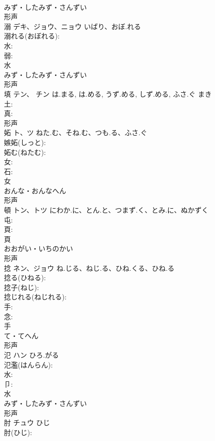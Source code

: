 \documentclass[8pt]{extreport}
\begin{document}
\begin{CJK}{UTF8}{min}
\\	みず・したみず・さんずい	
\\	形声 
\\	溺	デキ、ジョウ、ニョウ	いばり、おぼ.れる		
\\	溺れる(おぼれる): 
\\	水: 
\\	弱: 
\\	水	
\\	みず・したみず・さんずい	
\\	形声 
\\	填	テン、 チン	は.まる, は.める, うず.める, しず.める, ふさ.ぐ	まき	
\\	土: 
\\	真: 
\\	形声 
\\	妬	ト、ツ	ねた.む、そね.む、つも.る、ふさ.ぐ		
\\	嫉妬(しっと): 
\\	妬む(ねたむ): 
\\	女: 
\\	石: 
\\	女	
\\	おんな・おんなへん	
\\	形声 
\\	頓	トン、トツ	にわか.に、とん.と、つまず.く、とみ.に、ぬかずく		
\\	屯: 
\\	頁: 
\\	頁	
\\	おおがい・いちのかい	
\\	形声 
\\	捻	ネン、ジョウ	ね.じる、ねじ.る、ひね.くる、ひね.る		
\\	捻る(ひねる): 
\\	捻子(ねじ): 
\\	捻じれる(ねじれる): 
\\	手: 
\\	念: 
\\	手	
\\	て・てへん	
\\	形声 
\\	氾	ハン	ひろ.がる		
\\	氾濫(はんらん): 
\\	水: 
\\	卩: 
\\	水	
\\	みず・したみず・さんずい	
\\	形声 
\\	肘	チュウ	ひじ		
\\	肘(ひじ): 

\end{CJK}
\end{document}
